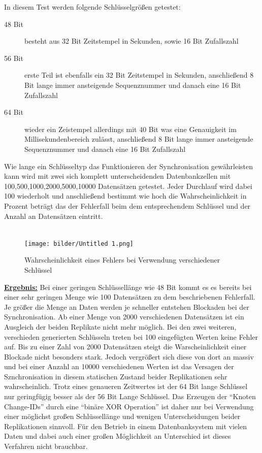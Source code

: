\documentclass[a4paper,11pt,oneside,%
headsepline,												%
footsepline,												%
bibtotocnumbered									%
]{scrreprt}
\begin{document}
In diesem Test werden folgende Schlüsselgrößen getestet:
\begin{description}
	\item[48 Bit] besteht aus 32 Bit Zeitstempel in Sekunden, sowie 16 Bit Zufallszahl
	\item[56 Bit] erste Teil ist ebenfalls ein 32 Bit Zeitstempel in Sekunden, anschließend 8 Bit lange immer ansteigende Sequenznummer und danach eine 16 Bit Zufallszahl
	\item[64 Bit] wieder ein Zeistempel allerdings mit 40 Bit was eine Genauigkeit im Millisekundenbereich zulässt, anschließend 8 Bit lange immer ansteigende Sequenznummer und danach eine 16 Bit Zufallszahl
\end{description}
	
Wie lange ein Schlüsseltyp das Funktionieren der Synchronisation gewährleisten kann wird mit zwei sich komplett unterscheidenden Datenbankzellen mit 100,500,1000,2000,5000,10000  Datensätzen getestet. Jeder Durchlauf wird dabei 100 wiederholt und anschließend bestimmt wie hoch die Wahrscheinlichkeit in Prozent beträgt das der Fehlerfall beim dem entsprechendem Schlüssel und der Anzahl an Datensätzen eintritt.\\\\
\begin{figure}[h!]
    \centering
    \texttt{[image: bilder/Untitled 1.png]}
    \caption{Wahrscheinlichkeit eines Fehlers bei Verwendung verschiedener Schlüssel}
\end{figure}


\underline{{\bf Ergebnis:}} Bei einer geringen Schlüssellänge wie 48 Bit kommt es es bereits bei einer sehr geringen Menge wie 100 Datensätzen zu dem beschriebenen Fehlerfall. Je größer die Menge an Daten werden je schneller entstehen Blockaden bei der Synchronisation. Ab einer Menge von 2000 verschiedenen Datensätzen ist ein Ausgleich der beiden Replikate nicht mehr möglich. Bei den zwei weiteren, verschieden generierten Schlüsseln treten bei 100 eingefügten Werten keine Fehler auf. Bis zu einer Zahl von 2000 Datensätzen steigt die Warscheinlichkeit einer Blockade nicht besonders stark. Jedoch vergrößert sich diese von dort an massiv und bei einer Anzahl an 10000 verschiedenen Werten ist das Versagen der Sznchronisation in diesem statischen Zustand beider Replikationen sehr wahrscheinlich. Trotz eines genaueren Zeitwertes ist der 64 Bit lange Schlüssel nur geringfügig besser als der 56 Bit Lange Schlüssel. Das Erzeugen der \enquote{Knoten Change-IDs} durch eine \enquote{binäre XOR Operation} ist daher nur bei Verwendung einer möglichst großen Schlüssellänge und wenigen Unterscheidungen beider Replikationen sinnvoll. Für den Betrieb in einem Datenbanksystem mit vielen Daten und dabei auch einer großen Möglichkeit an Unterschied ist dieses Verfahren nicht brauchbar.\\\\
\end{document}
